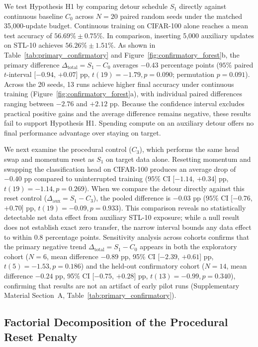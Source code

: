 \documentclass[10pt]{article}
\begin{document}
We test Hypothesis H1 by comparing detour schedule $S_1$ directly against continuous baseline $C_0$ across $N = 20$ paired random seeds under the matched 35,000-update budget. Continuous training on CIFAR-100 alone reaches a mean test accuracy of $56.69\% \pm 0.75\%$. In comparison, inserting 5,000 auxiliary updates on STL-10 achieves $56.26\% \pm 1.51\%$. As shown in Table~\ref{tab:primary_confirmatory} and Figure~\ref{fig:confirmatory_forest}b, the primary difference $\Delta_{\mathrm{total}} = S_1 - C_0$ averages $-0.43$ percentage points ($95\%$ paired $t$-interval [$-0.94$, $+0.07$] pp, $t(19) = -1.79, p = 0.090$; permutation $p = 0.091$). Across the 20 seeds, 13 runs achieve higher final accuracy under continuous training (Figure~\ref{fig:confirmatory_forest}a), with individual paired differences ranging between $-2.76$ and $+2.12$ pp. Because the confidence interval excludes practical positive gains and the average difference remains negative, these results fail to support Hypothesis H1. Spending compute on an auxiliary detour offers no final performance advantage over staying on target.

We next examine the procedural control ($C_3$), which performs the same head swap and momentum reset as $S_1$ on target data alone. Resetting momentum and swapping the classification head on CIFAR-100 produces an average drop of $-0.40$ pp compared to uninterrupted training ($95\%$ CI [$-1.14$, $+0.34$] pp, $t(19) = -1.14, p = 0.269$). When we compare the detour directly against this reset control ($\Delta_{\mathrm{aux}} = S_1 - C_3$), the pooled difference is $-0.03$ pp ($95\%$ CI [$-0.76$, $+0.70$] pp, $t(19) = -0.09, p = 0.933$). This comparison reveals no statistically detectable net data effect from auxiliary STL-10 exposure; while a null result does not establish exact zero transfer, the narrow interval bounds any data effect to within 0.8 percentage points. Sensitivity analysis across cohorts confirms that the primary negative trend $\Delta_{\mathrm{total}} = S_1 - C_0$ appears in both the exploratory cohort ($N = 6$, mean difference $-0.89$ pp, 95\% CI [$-2.39$, $+0.61$] pp, $t(5) = -1.53, p = 0.186$) and the held-out confirmatory cohort ($N = 14$, mean difference $-0.24$ pp, 95\% CI [$-0.75$, $+0.28$] pp, $t(13) = -0.99, p = 0.340$), confirming that results are not an artifact of early pilot runs (Supplementary Material Section~A, Table~\ref{tab:primary_confirmatory}).

\subsection{Factorial Decomposition of the Procedural Reset Penalty}\label{subsec:results_procedural}
\end{document}
